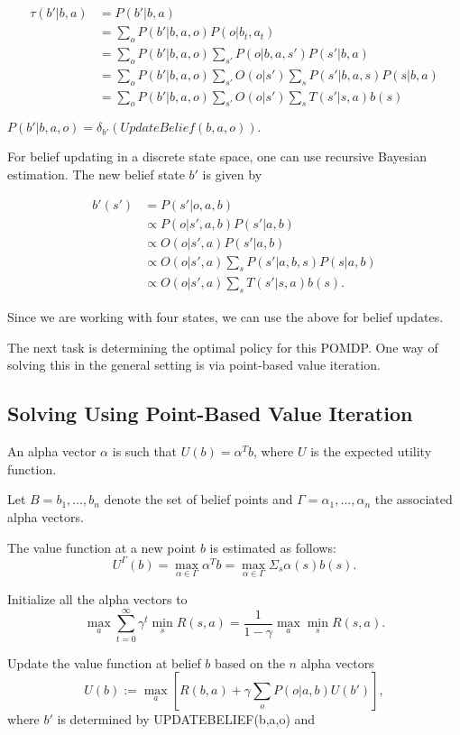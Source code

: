\documentclass[english]{article}
\numberwithin{equation}{section}
\begin{document}
\begin{align*}
\tau(b'|b,a) &= P(b'|b,a) \\
&= \sum_o P(b'|b,a,o)P(o|b_t,a_t) \\
&= \sum_o P(b'|b,a,o)\sum_{s'} P(o|b,a,s') P(s'|b,a) \\
&= \sum_o P(b'|b,a,o) \sum_{s'} O(o|s') \sum_{s} P(s'|b,a,s) P(s|b,a) \\
&= \sum_{o} P(b'|b,a,o)\sum_{s'}O(o|s') \sum_{s}T(s'|s,a) b(s)
\end{align*}

$P(b'|b,a,o)=\delta_{b'} (UpdateBelief(b,a,o)).$

For belief updating in a discrete state space, one can use recursive Bayesian estimation. The new belief state $b'$ is given by

\begin{align*}
b'(s') &= P(s'|o,a,b) \\
&\propto P(o|s',a,b)P(s'|a,b) \\
&\propto O(o|s',a)P(s'|a,b) \\
&\propto O(o|s',a)\sum_{s} P(s'|a,b,s) P(s|a,b) \\
&\propto O(o|s',a)\sum_{s} T(s'|s,a)b(s).
\end{align*}

Since we are working with four states, we can use the above for belief updates.

The next task is determining the optimal policy for this POMDP. One way of solving this in the general setting is via point-based value iteration.

\subsection{Solving Using Point-Based Value Iteration}
An alpha vector $\alpha$ is such that $U(b) = \alpha^{T}b$, where $U$ is the expected utility function.

Let $B = {b_1,\ldots,b_n}$ denote the set of belief points and $\Gamma = {\alpha_1,\ldots,\alpha_n}$ the associated alpha vectors.

The value function at a new point $b$ is estimated as follows:
$$U^{\Gamma}(b) = \max_{\alpha\in \Gamma} \alpha^{T}b = \max_{\alpha\in \Gamma} \Sigma_{s} \alpha(s)b(s).$$

Initialize all the alpha vectors to
$$
\max_{a} \sum_{t=0}^{\infty} \gamma^t \min_s R(s,a)=\frac{1}{1-\gamma} \max_a \min_s R(s,a).
$$

Update the value function at belief $b$ based on the $n$ alpha vectors
$$
U(b) := \max_a \left[ R(b,a) + \gamma \sum_o P(o|a,b)U(b') \right], 
$$
where $b'$ is determined by UPDATEBELIEF(b,a,o) and
\end{document}

